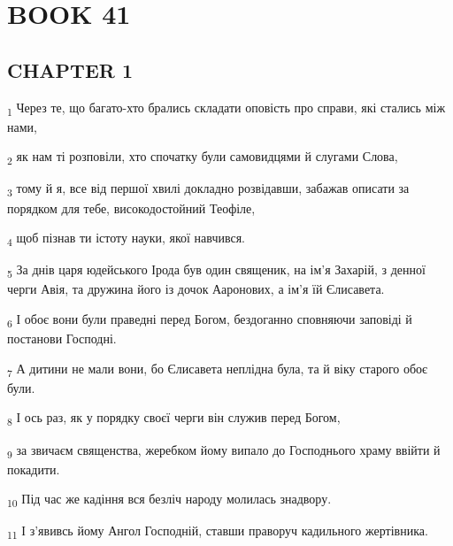 \section{BOOK 41}
\subsection{CHAPTER 1}
\begin{tcolorbox}
\textsubscript{1} Через те, що багато-хто брались складати оповість про справи, які стались між нами,
\end{tcolorbox}
\begin{tcolorbox}
\textsubscript{2} як нам ті розповіли, хто спочатку були самовидцями й слугами Слова,
\end{tcolorbox}
\begin{tcolorbox}
\textsubscript{3} тому й я, все від першої хвилі докладно розвідавши, забажав описати за порядком для тебе, високодостойний Теофіле,
\end{tcolorbox}
\begin{tcolorbox}
\textsubscript{4} щоб пізнав ти істоту науки, якої навчився.
\end{tcolorbox}
\begin{tcolorbox}
\textsubscript{5} За днів царя юдейського Ірода був один священик, на ім'я Захарій, з денної черги Авія, та дружина його із дочок Ааронових, а ім'я їй Єлисавета.
\end{tcolorbox}
\begin{tcolorbox}
\textsubscript{6} І обоє вони були праведні перед Богом, бездоганно сповняючи заповіді й постанови Господні.
\end{tcolorbox}
\begin{tcolorbox}
\textsubscript{7} А дитини не мали вони, бо Єлисавета неплідна була, та й віку старого обоє були.
\end{tcolorbox}
\begin{tcolorbox}
\textsubscript{8} І ось раз, як у порядку своєї черги він служив перед Богом,
\end{tcolorbox}
\begin{tcolorbox}
\textsubscript{9} за звичаєм священства, жеребком йому випало до Господнього храму ввійти й покадити.
\end{tcolorbox}
\begin{tcolorbox}
\textsubscript{10} Під час же кадіння вся безліч народу молилась знадвору.
\end{tcolorbox}
\begin{tcolorbox}
\textsubscript{11} І з'явивсь йому Ангол Господній, ставши праворуч кадильного жертівника.
\end{tcolorbox}
